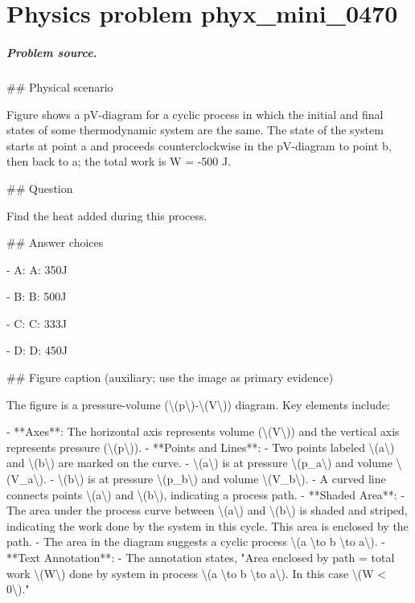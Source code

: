 
\chapter{Physics problem phyx\_mini\_0470}
\label{ch:PhyXMiniProblems_problem_phyx_mini_0470}

\paragraph{Problem source.}
\#\# Physical scenario

Figure shows a pV-diagram for a cyclic process in which the initial and final states of some thermodynamic system are the same. The state of the system starts at point a and proceeds counterclockwise in the pV-diagram to point b, then back to a; the total work is W = -500 J.

\#\# Question

Find the heat added during this process.

\#\# Answer choices

- A: A: 350J

- B: B: 500J

- C: C: 333J

- D: D: 450J

\#\# Figure caption (auxiliary; use the image as primary evidence)

The figure is a pressure-volume (\textbackslash{}(p\textbackslash{})-\textbackslash{}(V\textbackslash{})) diagram. Key elements include:

- **Axes**: The horizontal axis represents volume (\textbackslash{}(V\textbackslash{})) and the vertical axis represents pressure (\textbackslash{}(p\textbackslash{})).
- **Points and Lines**: 
  - Two points labeled \textbackslash{}(a\textbackslash{}) and \textbackslash{}(b\textbackslash{}) are marked on the curve. 
  - \textbackslash{}(a\textbackslash{}) is at pressure \textbackslash{}(p\_a\textbackslash{}) and volume \textbackslash{}(V\_a\textbackslash{}).
  - \textbackslash{}(b\textbackslash{}) is at pressure \textbackslash{}(p\_b\textbackslash{}) and volume \textbackslash{}(V\_b\textbackslash{}).
  - A curved line connects points \textbackslash{}(a\textbackslash{}) and \textbackslash{}(b\textbackslash{}), indicating a process path.
- **Shaded Area**: 
  - The area under the process curve between \textbackslash{}(a\textbackslash{}) and \textbackslash{}(b\textbackslash{}) is shaded and striped, indicating the work done by the system in this cycle. This area is enclosed by the path.
  - The area in the diagram suggests a cyclic process \textbackslash{}(a \textbackslash{}to b \textbackslash{}to a\textbackslash{}).
- **Text Annotation**: 
  - The annotation states, "Area enclosed by path = total work \textbackslash{}(W\textbackslash{}) done by system in process \textbackslash{}(a \textbackslash{}to b \textbackslash{}to a\textbackslash{}). In this case \textbackslash{}(W < 0\textbackslash{})."
  
